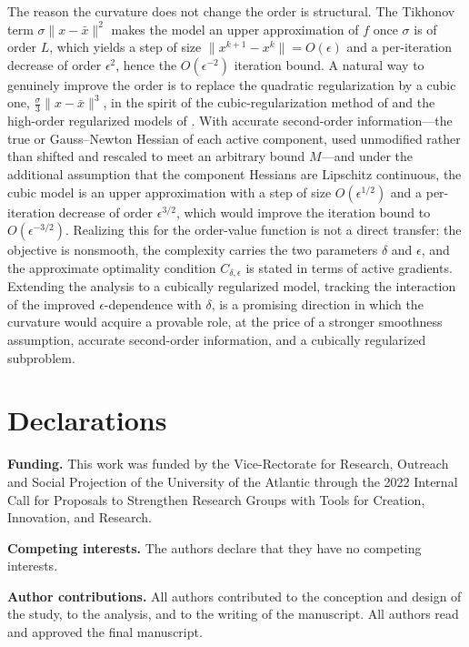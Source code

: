 \documentclass[11pt]{article}
\begin{document}
The reason the curvature does not change the order is structural. The Tikhonov
term $\sigma\|x - \bar x\|^2$ makes the model an upper approximation of $f$ once
$\sigma$ is of order $L$, which yields a step of size
$\|x^{k+1} - x^k\| = O(\epsilon)$ and a per-iteration decrease of order
$\epsilon^2$, hence the $O(\epsilon^{-2})$ iteration bound. A natural way to
genuinely improve the order is to replace the quadratic regularization by a
cubic one, $\tfrac{\sigma}{3}\|x - \bar x\|^3$, in the spirit of the
cubic-regularization method of \cite{nesterov} and the high-order regularized
models of \cite{bgmst1, bgms}. With accurate second-order information---the true
or Gauss--Newton Hessian of each active component, used unmodified rather than
shifted and rescaled to meet an arbitrary bound $M$---and under the additional
assumption that the component Hessians are
Lipschitz continuous, the cubic model is an upper approximation with a step of
size $O(\epsilon^{1/2})$ and a per-iteration decrease of order $\epsilon^{3/2}$,
which would improve the iteration bound to $O(\epsilon^{-3/2})$. Realizing this
for the order-value function is not a direct transfer: the objective is
nonsmooth, the complexity carries the two parameters $\delta$ and $\epsilon$, and
the approximate optimality condition $C_{\delta,\epsilon}$ is stated in terms of
active gradients. Extending the analysis to a cubically regularized model,
tracking the interaction of the improved $\epsilon$-dependence with $\delta$, is
a promising direction in which the curvature would acquire a provable role, at
the price of a stronger smoothness assumption, accurate second-order information,
and a cubically regularized subproblem.

\section*{Declarations}

\noindent\textbf{Funding.} This work was funded by the Vice-Rectorate for
Research, Outreach and Social Projection of the University of the Atlantic
through the 2022 Internal Call for Proposals to Strengthen Research Groups with
Tools for Creation, Innovation, and Research.

\medskip
\noindent\textbf{Competing interests.} The authors declare that they have no
competing interests.

\medskip
\noindent\textbf{Author contributions.} All authors contributed to the
conception and design of the study, to the analysis, and to the writing of the
manuscript. All authors read and approved the final manuscript.
\end{document}
